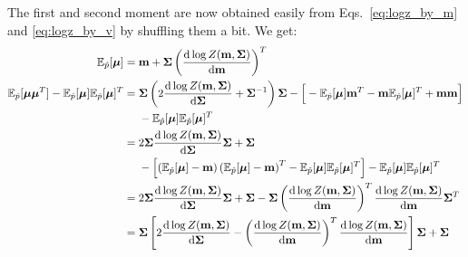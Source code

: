 \documentclass[11pt]{article}
\begin{document}
The first and second moment are now obtained easily from 
Eqs.~\eqref{eq:logz_by_m} and \eqref{eq:logz_by_v} by shuffling them 
a bit. We get:
\begin{align}
	\mathbb{E}_{\hat{p}}[\boldsymbol{\mu}] &= \mathbf{m} +
		\mathbf{\Sigma}\left(\frac{\mathrm{d}\log Z(\mathbf{m}, \mathbf{\Sigma})}{\mathrm{d}\mathbf{m}}\right)^T
		\label{eq:minimiser_mean}
		\\
	\mathbb{E}_{\hat{p}}[\boldsymbol{\mu}\boldsymbol{\mu}^T] - \mathbb{E}_{\hat{p}}[\boldsymbol{\mu}]\mathbb{E}_{\hat{p}}[\boldsymbol{\mu}]^T
		&=
		\mathbf{\Sigma}\left(2\frac{\mathrm{d}\log Z(\mathbf{m}, \mathbf{\Sigma})}{\mathrm{d} \mathbf{\Sigma}}
									 + \mathbf{\Sigma}^{-1}\right)\mathbf{\Sigma}
				 - \Big[-\mathbb{E}_{\hat{p}}[\boldsymbol{\mu}]\mathbf{m}^T
				        -\mathbf{m}\mathbb{E}_{\hat{p}}[\boldsymbol{\mu}]^T
				        +\mathbf{m}\mathbf{m}\Big]\notag\\
		&\hphantom{=|}\mbox{}
			- \mathbb{E}_{\hat{p}}[\boldsymbol{\mu}]\mathbb{E}_{\hat{p}}[\boldsymbol{\mu}]^T\\
		&=
		2\mathbf{\Sigma}\frac{\mathrm{d}\log Z(\mathbf{m}, \mathbf{\Sigma})}{\mathrm{d} \mathbf{\Sigma}}\mathbf{\Sigma} 
				 + \mathbf{\Sigma}\notag\\
		&\hphantom{=|}\mbox{}
			- \left[\left(\mathbb{E}_{\hat{p}}[\boldsymbol{\mu}] - \mathbf{m}\right)
							\left(\mathbb{E}_{\hat{p}}[\boldsymbol{\mu}] - \mathbf{m}\right)^T
							- \mathbb{E}_{\hat{p}}[\boldsymbol{\mu}]\mathbb{E}_{\hat{p}}[\boldsymbol{\mu}]^T\right]
			- \mathbb{E}_{\hat{p}}[\boldsymbol{\mu}]\mathbb{E}_{\hat{p}}[\boldsymbol{\mu}]^T\\
		&=
		2\mathbf{\Sigma}\frac{\mathrm{d}\log Z(\mathbf{m}, \mathbf{\Sigma})}{\mathrm{d} \mathbf{\Sigma}}\mathbf{\Sigma} + \mathbf{\Sigma}
			- \mathbf{\Sigma}\left(\frac{\mathrm{d}\log Z(\mathbf{m}, \mathbf{\Sigma})}{\mathrm{d}\mathbf{m}}\right)^T
				\frac{\mathrm{d}\log Z(\mathbf{m}, \mathbf{\Sigma})}{\mathrm{d}\mathbf{m}}\mathbf{\Sigma}^T\\
		&=
		\mathbf{\Sigma}\left[
		2\frac{\mathrm{d}\log Z(\mathbf{m}, \mathbf{\Sigma})}{\mathrm{d} \mathbf{\Sigma}}
			- \left(\frac{\mathrm{d}\log Z(\mathbf{m}, \mathbf{\Sigma})}{\mathrm{d}\mathbf{m}}\right)^T
				\frac{\mathrm{d}\log Z(\mathbf{m}, \mathbf{\Sigma})}{\mathrm{d}\mathbf{m}}\right]\mathbf{\Sigma}
			+ \mathbf{\Sigma}
		\label{eq:minimiser_var}
\end{align}
\end{document}
